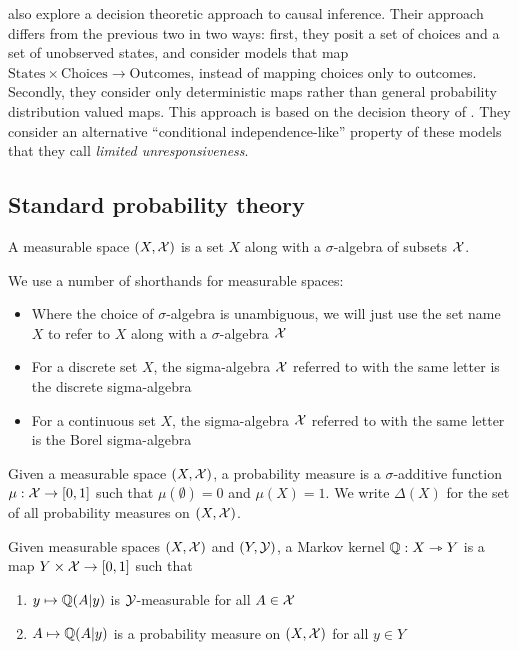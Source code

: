 \citet{heckerman_decision-theoretic_1995} also explore a decision theoretic approach to causal inference. Their approach differs from the previous two in two ways: first, they posit a set of choices and a set of unobserved states, and consider models that map $\mathrm{States}\times\mathrm{Choices}\to \mathrm{Outcomes}$, instead of mapping choices only to outcomes. Secondly, they consider only deterministic maps rather than general probability distribution valued maps. This approach is based on the decision theory of \citet{savage_foundations_1954}. They consider an alternative ``conditional independence-like'' property of these models that they call \emph{limited unresponsiveness}.


\subsection{Standard probability theory}\label{sec:standard_prob}

\begin{definition}
A measurable space $(X,\mathcal{X})$ is a set $X$ along with a $\sigma$-algebra of subsets $\mathcal{X}$.
\end{definition}

We use a number of shorthands for measurable spaces:
\begin{itemize}
	\item Where the choice of $\sigma$-algebra is unambiguous, we will just use the set name $X$ to refer to $X$ along with a $\sigma$-algebra $\mathcal{X}$
	\item For a discrete set $X$, the sigma-algebra $\mathcal{X}$ referred to with the same letter is the discrete sigma-algebra
	\item For a continuous set $X$, the sigma-algebra $\mathcal{X}$ referred to with the same letter is the Borel sigma-algebra
\end{itemize}

\begin{definition}
Given a measurable space $(X,\mathcal{X})$, a probability measure is a $\sigma$-additive function $\mu:\mathcal{X}\to [0,1]$ such that $\mu(\emptyset)=0$ and $\mu(X)=1$. We write $\Delta(X)$ for the set of all probability measures on $(X,\mathcal{X})$.
\end{definition}

\begin{definition}\label{def:mkern}
Given measurable spaces $(X,\mathcal{X})$ and $(Y,\mathcal{Y})$, a Markov kernel $\mathbb{Q}:X\rightarrowtriangle Y$ is a map $Y\times \mathcal{X}\to [0,1]$ such that
\begin{enumerate}
	\item $y\mapsto \mathbb{Q}(A|y)$ is $\mathcal{Y}$-measurable for all $A\in \mathcal{X}$
	\item $A\mapsto \mathbb{Q}(A|y)$ is a probability measure on $(X,\mathcal{X})$ for all $y\in Y$
\end{enumerate}
\end{definition}

